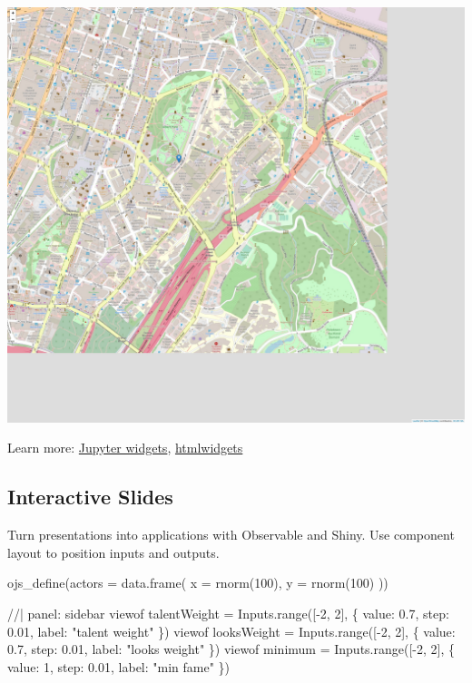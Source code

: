\documentclass[
  letterpaper,
  DIV=11,
  numbers=noendperiod]{scrartcl}
\newenvironment{Shaded}{\begin{snugshade}}{\end{snugshade}}
\newcommand{\AttributeTok}[1]{\textcolor[rgb]{0.40,0.45,0.13}{#1}}
\newcommand{\DecValTok}[1]{\textcolor[rgb]{0.68,0.00,0.00}{#1}}
\newcommand{\FunctionTok}[1]{\textcolor[rgb]{0.28,0.35,0.67}{#1}}
\newcommand{\NormalTok}[1]{\textcolor[rgb]{0.00,0.23,0.31}{#1}}
\begin{document}
\includegraphics{index-s-curve_files/figure-pdf/unnamed-chunk-7-1.pdf}

Learn more:
\href{https://quarto.org/docs/interactive/widgets/jupyter.html}{Jupyter
widgets},
\href{https://quarto.org/docs/interactive/widgets/htmlwidgets.html}{htmlwidgets}

\hypertarget{interactive-slides-1}{%
\subsection{Interactive Slides}\label{interactive-slides-1}}

Turn presentations into applications with Observable and Shiny. Use
component layout to position inputs and outputs.

\begin{Shaded}
\begin{Highlighting}[]
\FunctionTok{ojs\_define}\NormalTok{(}\AttributeTok{actors =} \FunctionTok{data.frame}\NormalTok{(}
  \AttributeTok{x =} \FunctionTok{rnorm}\NormalTok{(}\DecValTok{100}\NormalTok{),}
  \AttributeTok{y =} \FunctionTok{rnorm}\NormalTok{(}\DecValTok{100}\NormalTok{)}
\NormalTok{))}
\end{Highlighting}
\end{Shaded}

\begin{Shaded}
\begin{Highlighting}[]
\NormalTok{//| panel: sidebar}
\NormalTok{viewof talentWeight = Inputs.range([{-}2, 2], \{ value: 0.7, step: 0.01, label: "talent weight" \})}
\NormalTok{viewof looksWeight = Inputs.range([{-}2, 2], \{ value: 0.7, step: 0.01, label: "looks weight" \})}
\NormalTok{viewof minimum = Inputs.range([{-}2, 2], \{ value: 1, step: 0.01, label: "min fame" \})}
\end{Highlighting}
\end{Shaded}
\end{document}
